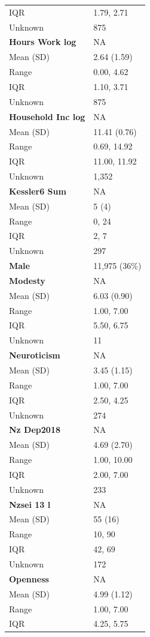 \documentclass[
  single column]{article}
\begin{document}
\begin{longtable}[]{@{}ll@{}}
IQR & 1.79, 2.71 \\
Unknown & 875 \\
\textbf{Hours Work log} & NA \\
Mean (SD) & 2.64 (1.59) \\
Range & 0.00, 4.62 \\
IQR & 1.10, 3.71 \\
Unknown & 875 \\
\textbf{Household Inc log} & NA \\
Mean (SD) & 11.41 (0.76) \\
Range & 0.69, 14.92 \\
IQR & 11.00, 11.92 \\
Unknown & 1,352 \\
\textbf{Kessler6 Sum} & NA \\
Mean (SD) & 5 (4) \\
Range & 0, 24 \\
IQR & 2, 7 \\
Unknown & 297 \\
\textbf{Male} & 11,975 (36\%) \\
\textbf{Modesty} & NA \\
Mean (SD) & 6.03 (0.90) \\
Range & 1.00, 7.00 \\
IQR & 5.50, 6.75 \\
Unknown & 11 \\
\textbf{Neuroticism} & NA \\
Mean (SD) & 3.45 (1.15) \\
Range & 1.00, 7.00 \\
IQR & 2.50, 4.25 \\
Unknown & 274 \\
\textbf{Nz Dep2018} & NA \\
Mean (SD) & 4.69 (2.70) \\
Range & 1.00, 10.00 \\
IQR & 2.00, 7.00 \\
Unknown & 233 \\
\textbf{Nzsei 13 l} & NA \\
Mean (SD) & 55 (16) \\
Range & 10, 90 \\
IQR & 42, 69 \\
Unknown & 172 \\
\textbf{Openness} & NA \\
Mean (SD) & 4.99 (1.12) \\
Range & 1.00, 7.00 \\
IQR & 4.25, 5.75 \\

\end{longtable}
\end{document}
